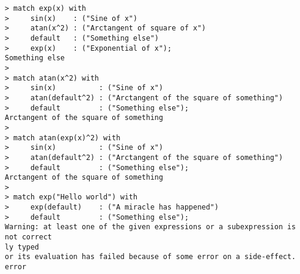 \begin{center}\begin{minipage}{15cm}\begin{Verbatim}[frame=single]
> match exp(x) with 
>     sin(x)    : ("Sine of x")
>     atan(x^2) : ("Arctangent of square of x")
>     default   : ("Something else")
>     exp(x)    : ("Exponential of x");
Something else
> 
> match atan(x^2) with 
>     sin(x)          : ("Sine of x")
>     atan(default^2) : ("Arctangent of the square of something")
>     default         : ("Something else");
Arctangent of the square of something
> 
> match atan(exp(x)^2) with 
>     sin(x)          : ("Sine of x")
>     atan(default^2) : ("Arctangent of the square of something")
>     default         : ("Something else");
Arctangent of the square of something
> 
> match exp("Hello world") with 
>     exp(default)    : ("A miracle has happened")
>     default         : ("Something else");
Warning: at least one of the given expressions or a subexpression is not correct
ly typed
or its evaluation has failed because of some error on a side-effect.
error
\end{Verbatim}
\end{minipage}\end{center}
